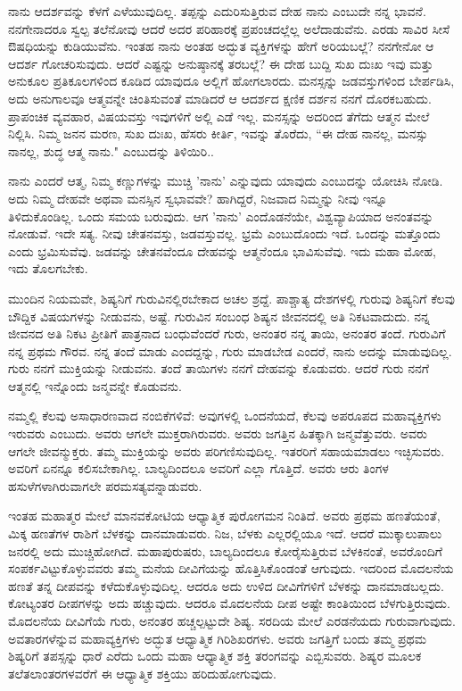 ನಾನು ಆದರ್ಶವನ್ನು ಕೆಳಗೆ ಎಳೆಯುವುದಿಲ್ಲ. ತಪ್ಪನ್ನು ಎದುರಿಸುತ್ತಿರುವ ದೇಹ ನಾನು ಎಂಬುದೇ ನನ್ನ ಭಾವನೆ. ನನಗೇನಾದರೂ ಸ್ವಲ್ಪ ತಲೆನೋವು ಆದರೆ ಅದರ ಪರಿಹಾರಕ್ಕೆ ಪ್ರಪಂಚದಲ್ಲೆಲ್ಲ ಅಲೆದಾಡುವೆನು. ಎರಡು ಸಾವಿರ ಸೀಸೆ ಔಷಧಿಯನ್ನು ಕುಡಿಯುವೆನು. ಇಂತಹ ನಾನು ಅಂತಹ ಅದ್ಭುತ ವ್ಯಕ್ತಿಗಳನ್ನು ಹೇಗೆ ಅರಿಯಬಲ್ಲೆ? ನನಗೇನೋ ಆ ಆದರ್ಶ ಗೋಚರಿಸುವುದು. ಆದರೆ ಎಷ್ಟನ್ನು ಅನುಷ್ಠಾನಕ್ಕೆ ತರಬಲ್ಲೆ? ಈ ದೇಹ ಬುದ್ದಿ ಸುಖ ದುಃಖ ಇವು ಮತ್ತು ಅನುಕೂಲ ಪ್ರತಿಕೂಲಗಳಿಂದ ಕೂಡಿದ ಯಾವುದೂ ಅಲ್ಲಿಗೆ ಹೋಗಲಾರದು. ಮನಸ್ಸನ್ನು ಜಡವಸ್ತುಗಳಿಂದ ಬೇರ್ಪಡಿಸಿ, ಅದು ಅನುಗಾಲವೂ ಆತ್ಮವನ್ನೇ ಚಿಂತಿಸುವಂತೆ ಮಾಡಿದರೆ ಆ ಆದರ್ಶದ ಕ್ಷಣಿಕ ದರ್ಶನ ನನಗೆ ದೊರಕಬಹುದು. ಪ್ರಾಪಂಚಿಕ ವ್ಯವಹಾರ, ವಿಷಯವಸ್ತು ಇವುಗಳಿಗೆ ಅಲ್ಲಿ ಎಡೆ ಇಲ್ಲ. ಮನಸ್ಸನ್ನು ಅದರಿಂದ ತೆಗೆದು ಆತ್ಮನ ಮೇಲೆ ನಿಲ್ಲಿಸಿ. ನಿಮ್ಮ ಜನನ ಮರಣ, ಸುಖ ದುಃಖ, ಹೆಸರು ಕೀರ್ತಿ, ಇವನ್ನು ತೊರೆದು, “ಈ ದೇಹ ನಾನಲ್ಲ, ಮನಸ್ಸು ನಾನಲ್ಲ, ಶುದ್ಧ ಆತ್ಮ ನಾನು." ಎಂಬುದನ್ನು ತಿಳಿಯಿರಿ..

ನಾನು ಎಂದರೆ ಆತ್ಮ, ನಿಮ್ಮ ಕಣ್ಣುಗಳನ್ನು ಮುಚ್ಚಿ 'ನಾನು' ಎನ್ನುವುದು ಯಾವುದು ಎಂಬುದನ್ನು ಯೋಚಿಸಿ ನೋಡಿ. ಅದು ನಿಮ್ಮ ದೇಹವೇ ಅಥವಾ ಮನಸ್ಸಿನ ಸ್ವಭಾವವೇ? ಹಾಗಿದ್ದರೆ, ನಿಜವಾದ ನಿಮ್ಮನ್ನು ನೀವು ಇನ್ನೂ ತಿಳಿದುಕೊಂಡಿಲ್ಲ. ಒಂದು ಸಮಯ ಬರುವುದು. ಆಗ 'ನಾನು' ಎಂದೊಡನೆಯೇ, ವಿಶ್ವವ್ಯಾಪಿಯಾದ ಅನಂತವನ್ನು ನೋಡುವೆ. ಇದೇ ಸತ್ಯ. ನೀವು ಚೇತನವಸ್ತು, ಜಡವಸ್ತುವಲ್ಲ. ಭ್ರಮೆ ಎಂಬುದೊಂದು ಇದೆ. ಒಂದನ್ನು ಮತ್ತೊಂದು ಎಂದು ಭ್ರಮಿಸುವೆವು. ಜಡವನ್ನು ಚೇತನವೆಂದೂ ದೇಹವನ್ನು ಆತ್ಮನೆಂದೂ ಭಾವಿಸುವೆವು. ಇದು ಮಹಾ ಮೋಹ, ಇದು ತೊಲಗಬೇಕು.

ಮುಂದಿನ ನಿಯಮವೇ, ಶಿಷ್ಯನಿಗೆ ಗುರುವಿನಲ್ಲಿರಬೇಕಾದ ಅಚಲ ಶ್ರದ್ದೆ. ಪಾಶ್ಚಾತ್ಯ ದೇಶಗಳಲ್ಲಿ ಗುರುವು ಶಿಷ್ಯನಿಗೆ ಕೆಲವು ಬೌದ್ದಿಕ ವಿಷಯಗಳನ್ನು ನೀಡುವನು, ಅಷ್ಟೆ. ಗುರುವಿನ ಸಂಬಂಧ ಶಿಷ್ಯನ ಜೀವನದಲ್ಲಿ ಅತಿ ನಿಕಟವಾದುದು. ನನ್ನ ಜೀವನದ ಅತಿ ನಿಕಟ ಪ್ರೀತಿಗೆ ಪಾತ್ರನಾದ ಬಂಧುವೆಂದರೆ ಗುರು, ಅನಂತರ ನನ್ನ ತಾಯಿ, ಅನಂತರ ತಂದೆ. ಗುರುವಿಗೆ ನನ್ನ ಪ್ರಥಮ ಗೌರವ. ನನ್ನ ತಂದೆ ಮಾಡು ಎಂದದ್ದನ್ನು, ಗುರು ಮಾಡಬೇಡ ಎಂದರೆ, ನಾನು ಅದನ್ನು ಮಾಡುವುದಿಲ್ಲ. ಗುರು ನನಗೆ ಮುಕ್ತಿಯನ್ನು ನೀಡುವನು. ತಂದೆ ತಾಯಿಗಳು ನನಗೆ ದೇಹವನ್ನು ಕೊಡುವರು. ಆದರೆ ಗುರು ನನಗೆ ಆತ್ಮನಲ್ಲಿ ಇನ್ನೊಂದು ಜನ್ಮವನ್ನೇ ಕೊಡುವನು.

ನಮ್ಮಲ್ಲಿ ಕೆಲವು ಅಸಾಧಾರಣವಾದ ನಂಬಿಕೆಗಳಿವೆ: ಅವುಗಳಲ್ಲಿ ಒಂದನೆಯದೆ, ಕೆಲವು ಅಪರೂಪದ ಮಹಾವ್ಯಕ್ತಿಗಳು ಇರುವರು ಎಂಬುದು. ಅವರು ಆಗಲೇ ಮುಕ್ತರಾಗಿರುವರು. ಅವರು ಜಗತ್ತಿನ ಹಿತಕ್ಕಾಗಿ ಜನ್ಮವೆತ್ತುವರು. ಅವರು ಆಗಲೇ ಜೀವನ್ಮುಕ್ತರು. ತಮ್ಮ ಮುಕ್ತಿಯನ್ನು ಅವರು ಪರಿಗಣಿಸುವುದಿಲ್ಲ. ಇತರರಿಗೆ ಸಹಾಯಮಾಡಲು ಇಚ್ಛಿಸುವರು. ಅವರಿಗೆ ಏನನ್ನೂ ಕಲಿಸಬೇಕಾಗಿಲ್ಲ. ಬಾಲ್ಯದಿಂದಲೂ ಅವರಿಗೆ ಎಲ್ಲಾ ಗೊತ್ತಿದೆ. ಅವರು ಆರು ತಿಂಗಳ ಹಸುಳೆಗಳಾಗಿರುವಾಗಲೇ ಪರಮಸತ್ಯವನ್ನಾಡುವರು.

ಇಂತಹ ಮಹಾತ್ಮರ ಮೇಲೆ ಮಾನವಕೋಟಿಯ ಆಧ್ಯಾತ್ಮಿಕ ಪುರೋಗಮನ ನಿಂತಿದೆ. ಅವರು ಪ್ರಥಮ ಹಣತೆಯಂತೆ, ಮಿಕ್ಕ ಹಣತೆಗಳ ರಾಶಿಗೆ ಬೆಳಕನ್ನು ದಾನಮಾಡುವರು. ನಿಜ, ಬೆಳಕು ಎಲ್ಲರಲ್ಲಿಯೂ ಇದೆ. ಆದರೆ ಮುಕ್ಕಾಲುಪಾಲು ಜನರಲ್ಲಿ ಅದು ಮುಚ್ಚಿಹೋಗಿದೆ. ಮಹಾಪುರುಷರು, ಬಾಲ್ಯದಿಂದಲೂ ಕೋರೈಸುತ್ತಿರುವ ಬೆಳಕಿನಂತೆ, ಅವರೊಂದಿಗೆ ಸಂಪರ್ಕವಿಟ್ಟುಕೊಳ್ಳುವವರು ತಮ್ಮ ಮನೆಯ ದೀವಿಗೆಯನ್ನು ಹೊತ್ತಿಸಿಕೊಂಡಂತೆ ಆಗುವುದು. ಇದರಿಂದ ಮೊದಲನೆಯ ಹಣತೆ ತನ್ನ ದೀಪವನ್ನು ಕಳೆದುಕೊಳ್ಳುವುದಿಲ್ಲ. ಆದರೂ ಅದು ಉಳಿದ ದೀವಿಗೆಗಳಿಗೆ ಬೆಳಕನ್ನು ದಾನಮಾಡಬಲ್ಲದು. ಕೋಟ್ಯಂತರ ದೀಪಗಳನ್ನು ಅದು ಹಚ್ಚುವುದು. ಆದರೂ ಮೊದಲನೆಯ ದೀಪ ಅಷ್ಟೇ ಕಾಂತಿಯಿಂದ ಬೆಳಗುತ್ತಿರುವುದು. ಮೊದಲನೆಯ ದೀವಿಗೆಯೆ ಗುರು, ಅನಂತರ ಹಚ್ಚಲ್ಪಟ್ಟುದೇ ಶಿಷ್ಯ. ಸರದಿಯ ಮೇಲೆ ಎರಡನೆಯದು ಗುರುವಾಗುವುದು. ಅವತಾರಗಳೆನ್ನುವ ಮಹಾವ್ಯಕ್ತಿಗಳು ಅದ್ಭುತ ಆಧ್ಯಾತ್ಮಿಕ ಗಿರಿಶಿಖರಗಳು. ಅವರು ಜಗತ್ತಿಗೆ ಬಂದು ತಮ್ಮ ಪ್ರಥಮ ಶಿಷ್ಯರಿಗೆ ತಪಸ್ಸನ್ನು ಧಾರೆ ಎರೆದು ಒಂದು ಮಹಾ ಆಧ್ಯಾತ್ಮಿಕ ಶಕ್ತಿ ತರಂಗವನ್ನು ಎಬ್ಬಿಸುವರು. ಶಿಷ್ಯರ ಮೂಲಕ ತಲೆತಲಾಂತರಗಳವರೆಗೆ ಈ ಆಧ್ಯಾತ್ಮಿಕ ಶಕ್ತಿಯು ಹರಿದುಹೋಗುವುದು.

